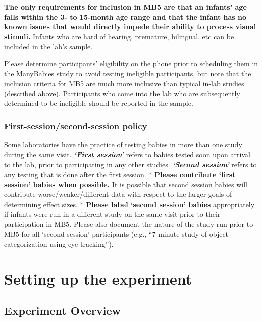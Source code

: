 \documentclass[
]{book}
\begin{document}
\textbf{The only requirements for inclusion in MB5 are that an infants' age falls within the 3- to 15-month age range and that the infant has no known issues that would directly impede their ability to process visual stimuli.} Infants who are hard of hearing, premature, bilingual, etc can be included in the lab's sample.

Please determine participants' eligibility on the phone prior to scheduling them in the ManyBabies study to avoid testing ineligible participants, but note that the inclusion criteria for MB5 are much more inclusive than typical in-lab studies (described above). Participants who come into the lab who are subsequently determined to be ineligible should be reported in the sample.

\hypertarget{first-sessionsecond-session-policy}{%
\subsection{First-session/second-session policy}\label{first-sessionsecond-session-policy}}

Some laboratories have the practice of testing babies in more than one study during the same visit. \textbf{\emph{`First session'}} refers to babies tested soon upon arrival to the lab, prior to participating in any other studies. \textbf{\emph{`Second session'}} refers to any testing that is done after the first session.
* \textbf{Please contribute `first session' babies when possible.} It is possible that second session babies will contribute worse/weaker/different data with respect to the larger goals of determining effect sizes.
* \textbf{Please label `second session' babies} appropriately if infants were run in a different study on the same visit prior to their participation in MB5. Please also document the nature of the study run prior to MB5 for all `second session' participants (e.g., ``7 minute study of object categorization using eye-tracking'').

\hypertarget{setting-up-the-experiment}{%
\chapter{Setting up the experiment}\label{setting-up-the-experiment}}

\hypertarget{experiment-overview}{%
\section{Experiment Overview}\label{experiment-overview}}
\end{document}
